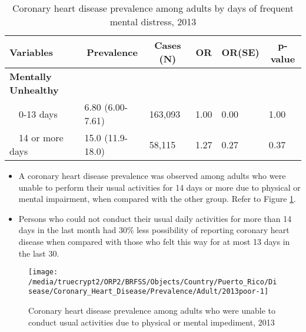 \begin{table}[H]
\caption{Coronary heart disease prevalence among adults by days of frequent mental distress, 2013\label{tab:mental.Coronary_Heart_Disease.2013}} 
\begin{center}
\begin{tabular}{llllll}
\hline\hline
\multicolumn{1}{l}{Variables}&\multicolumn{1}{c}{Prevalence}&\multicolumn{1}{c}{Cases (N)}&\multicolumn{1}{c}{OR}&\multicolumn{1}{c}{OR(SE)}&\multicolumn{1}{c}{p-value}\tabularnewline
\hline
{\bfseries Mentally Unhealthy}&&&&&\tabularnewline
~~0-13 days&6.80 (6.00-7.61)&163,093&1.00&0.00&1.00\tabularnewline
~~14 or more days&15.0 (11.9-18.0)& 58,115&1.27&0.27&0.37\tabularnewline
\hline
\end{tabular}\end{center}

\end{table}



 \newpage
\begin{itemize}

\item A  
coronary heart disease prevalence was observed among adults who were unable to perform their usual activities for 14 days or more due to physical or mental impairment, when compared with the other group. Refer to Figure \ref{fig:poor.Coronary_Heart_Disease.2013}.



\item Persons who could not conduct their usual daily activities for more than 14 days in the last month had 30\% less possibility of reporting coronary heart disease when compared with those who felt this way for at most 13 days in the last 30.

\end{itemize}

\begin{figure}[H]
\caption{Coronary heart disease prevalence among adults who were unable to conduct usual activities due to physical or mental impediment, 2013}
\label{fig:poor.Coronary_Heart_Disease.2013}

\begin{knitrout}
\color{fgcolor}

{\centering \texttt{[image: /media/truecrypt2/ORP2/BRFSS/Objects/Country/Puerto\_Rico/Disease/Coronary\_Heart\_Disease/Prevalence/Adult/2013poor-1]} 

}



\end{knitrout}
\end{figure}

